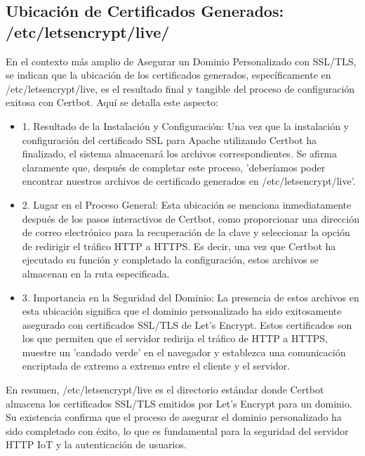 \documentclass{report}
\begin{document}
\subsection{Ubicación de Certificados Generados: /etc/letsencrypt/live/}
En el contexto más amplio de Asegurar un Dominio Personalizado con SSL/TLS, se  indican que la ubicación de los 
certificados generados, específicamente en /etc/letsencrypt/live, es el resultado final y tangible del proceso de 
configuración exitosa con Certbot.
Aquí se detalla este aspecto:
\begin{itemize}
    \item 1. Resultado de la Instalación y Configuración: Una vez que la instalación y configuración del certificado SSL para Apache 
    utilizando Certbot ha finalizado, el sistema almacenará los archivos correspondientes. Se afirma claramente que, 
    después de completar este proceso, 'deberíamos poder encontrar nuestros archivos de certificado generados en /etc/letsencrypt/live'.
    \item 2. Lugar en el Proceso General: Esta ubicación se menciona inmediatamente después de los pasos interactivos de Certbot, 
    como proporcionar una dirección de correo electrónico para la recuperación de la clave y seleccionar la opción de redirigir el 
    tráfico HTTP a HTTPS. Es decir, una vez que Certbot ha ejecutado su función y completado la configuración, estos archivos se 
    almacenan en la ruta especificada.
    \item 3. Importancia en la Seguridad del Dominio: La presencia de estos archivos en esta ubicación significa que el dominio 
    personalizado ha sido exitosamente asegurado con certificados SSL/TLS de Let's Encrypt. Estos certificados son los que permiten 
    que el servidor redirija el tráfico de HTTP a HTTPS, muestre un 'candado verde' en el navegador y establezca una comunicación 
    encriptada de extremo a extremo entre el cliente y el servidor.
\end{itemize}
En resumen, /etc/letsencrypt/live es el directorio estándar donde Certbot almacena los certificados SSL/TLS emitidos por Let's Encrypt 
para un dominio. Su existencia confirma que el proceso de asegurar el dominio personalizado ha sido completado con éxito, lo que es 
fundamental para la seguridad del servidor HTTP IoT y la autenticación de usuarios.
\end{document}
